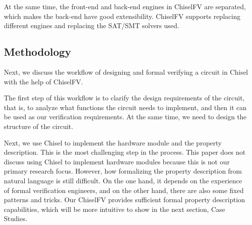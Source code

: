 \documentclass[conference]{IEEEtran}
\theoremstyle{definition}
\begin{document}

At the same time, the front-end and back-end engines in ChiselFV are separated, which makes the back-end have good extensibility. ChiselFV supports replacing different engines and replacing the SAT/SMT solvers used.

\subsection{Methodology}

Next, we discuss the workflow of designing and formal verifying a circuit in Chisel with the help of ChiselFV.

The first step of this workflow is to clarify the design requirements of the circuit, that is, to analyze what functions the circuit needs to implement, and then it can be used as our verification requirements. At the same time, we need to design the structure of the circuit.

Next, we use Chisel to implement the hardware module and the property description.
This is the most challenging step in the process. This paper does not discuss using Chisel to implement hardware modules because this is not our primary research focus. However, how formalizing the property description from natural language is still difficult.
On the one hand, it depends on the experience of formal verification engineers, and on the other hand, there are also some fixed patterns and tricks. Our ChiselFV provides sufficient formal property description capabilities, which will be more intuitive to show in the next section, Case Studies.
\end{document}
